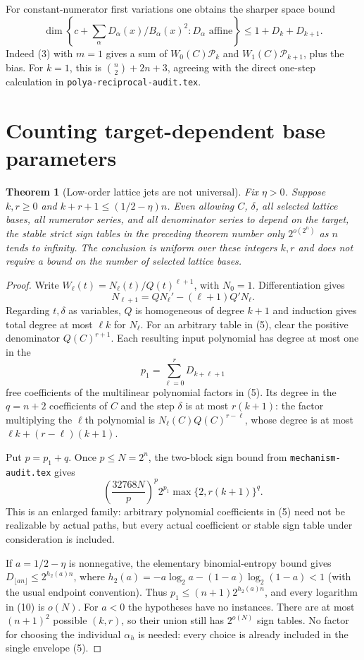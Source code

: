 \documentclass[11pt]{article}
\newtheorem{theorem}{Theorem}
\begin{document}
For constant-numerator first variations one obtains the sharper
space bound
\[
 \dim\left\{c+\sum_\alpha D_\alpha(x)/B_\alpha(x)^2:
                         D_\alpha\text{ affine}\right\}
                    \le 1+D_k+D_{k+1}.
 \tag{8}
\]
Indeed (3) with $m=1$ gives a sum of
$W_0(C)\mathcal P_k$ and $W_1(C)\mathcal P_{k+1}$, plus the bias.
For $k=1$, this is $\binom n2+2n+3$, agreeing with the direct
one-step calculation in \texttt{polya-reciprocal-audit.tex}.

\section{Counting target-dependent base parameters}

\begin{theorem}[Low-order lattice jets are not universal]
Fix $\eta>0$. Suppose $k,r\ge0$ and
$k+r+1\le(1/2-\eta)n$. Even allowing $C$, $\delta$, all selected
lattice bases, all numerator series, and all denominator series to
depend on the target, the stable strict sign tables in the preceding
theorem number only $2^{o(2^n)}$ as $n$ tends to infinity.
The conclusion is uniform over these integers $k,r$ and does not
require a bound on the number of selected lattice bases.
\end{theorem}
\begin{proof}
Write $W_\ell(t)=N_\ell(t)/Q(t)^{\ell+1}$, with $N_0=1$.
Differentiation gives
\[
 N_{\ell+1}=Q N_\ell'-(\ell+1)Q'N_\ell.
 \tag{9}
\]
Regarding $t,\delta$ as variables, $Q$ is homogeneous of degree
$k+1$ and induction gives total degree at most $\ell k$ for
$N_\ell$. For an arbitrary table in (5), clear the positive
denominator $Q(C)^{r+1}$. Each resulting input polynomial has
degree at most one in the
\[
                       p_1=\sum_{\ell=0}^r D_{k+\ell+1}
\]
free coefficients of the multilinear polynomial factors in (5).
Its degree in the $q=n+2$ coefficients of $C$ and the step
$\delta$ is at most $r(k+1)$: the factor multiplying the
$\ell$th polynomial is $N_\ell(C)Q(C)^{r-\ell}$, whose degree
is at most $\ell k+(r-\ell)(k+1)$.

Put $p=p_1+q$. Once $p\le N=2^n$, the two-block sign bound from
\texttt{mechanism-audit.tex} gives
\[
 \left(\frac{32768N}{p}\right)^p
      2^{p_1}\max\{2,r(k+1)\}^{q}.
 \tag{10}
\]
This is an enlarged family: arbitrary polynomial coefficients in
(5) need not be realizable by actual paths, but every actual
coefficient or stable sign table under consideration is included.

If $a=1/2-\eta$ is nonnegative, the elementary binomial-entropy
bound gives $D_{\lfloor an\rfloor}\le2^{h_2(a)n}$, where
$h_2(a)=-a\log_2a-(1-a)\log_2(1-a)<1$ (with the usual endpoint
convention). Thus $p_1\le(n+1)2^{h_2(a)n}$, and every logarithm
in (10) is $o(N)$. For $a<0$ the hypotheses have no instances.
There are at most $(n+1)^2$ possible $(k,r)$, so their union still
has $2^{o(N)}$ sign tables. No factor for choosing the individual
$\alpha_h$ is needed: every choice is already included in the
single envelope (5).
\end{proof}
\end{document}
